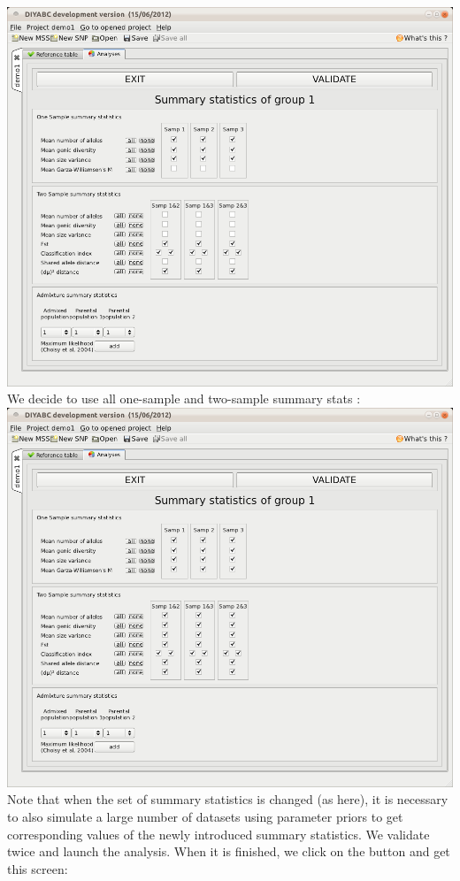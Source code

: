 \includegraphics[scale=0.35]{gui_pictures/Capture-DIYABC-56.png} \\

We decide to use all one-sample and two-sample summary stats :\\

\includegraphics[scale=0.35]{gui_pictures/Capture-DIYABC-57.png} \\
 

Note that when the set of summary statistics is changed (as here), it is necessary to also simulate a large number of datasets using parameter priors to get corresponding values of the newly introduced summary statistics. We validate twice and launch the analysis. When it is finished, we click on the   button and get this screen:\\

